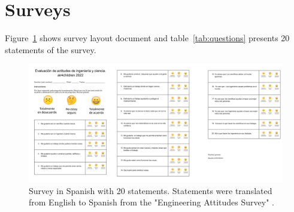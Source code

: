 \documentclass[sigconf]{acmart}
\begin{document}
\section*{Surveys}
Figure~\ref{fig:survey} shows survey layout document and table~\ref{tab:questions} presents 20 statements of the survey.
\begin{figure} %
  \centering
    \includegraphics[width=\linewidth]{../figures/surveys/outputs/drawing-v00.png}  %
    \caption{
    Survey in Spanish with 20 statements.
	Statements were translated from English to Spanish from the "Engineering Attitudes Survey" \cite{cunningham2010impact}.
    }
    \label{fig:survey}
\end{figure}
\end{document}
